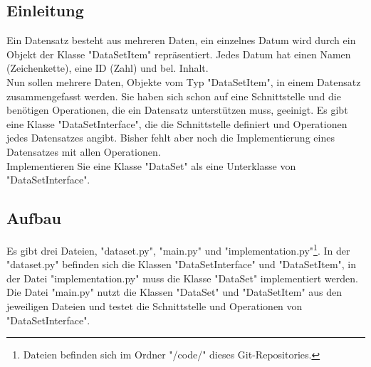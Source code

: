 \documentclass[
oneside,
12pt,
a4paper,
parskip=full
]{scrartcl}
\begin{document}
\justifying


\subsection{ Einleitung}
Ein Datensatz besteht aus mehreren Daten, ein einzelnes Datum wird durch ein Objekt der Klasse "DataSetItem" repräsentiert.
Jedes Datum hat einen Namen (Zeichenkette), eine ID (Zahl) und bel. Inhalt.\\
Nun sollen mehrere Daten, Objekte vom Typ "DataSetItem", in einem Datensatz zusammengefasst werden.
Sie haben sich schon auf eine Schnittstelle und die benötigen Operationen, die ein Datensatz unterstützen muss, geeinigt.
Es gibt eine Klasse "DataSetInterface", die die Schnittstelle definiert und Operationen jedes Datensatzes angibt.
Bisher fehlt aber noch die Implementierung eines Datensatzes mit allen Operationen.\\
Implementieren Sie eine Klasse "DataSet" als eine Unterklasse von "DataSetInterface".\\
\subsection{Aufbau}

	Es gibt drei Dateien, "dataset.py", "main.py" und "implementation.py"\footnote{Dateien befinden sich im Ordner "/code/" dieses Git-Repositories.}.
	In der "dataset.py" befinden sich die Klassen "DataSetInterface" und "DataSetItem",
	in der Datei "implementation.py" muss die Klasse "DataSet" implementiert werden.
	Die Datei "main.py" nutzt die Klassen "DataSet" und "DataSetItem" aus den jeweiligen Dateien und testet die Schnittstelle und Operationen von "DataSetInterface".


\end{document}
